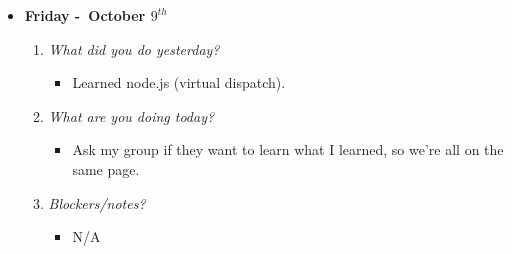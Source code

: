 \begin{itemize}
  \item[] \textbf{\large Friday -\ October \(9^{th}\)}
  \begin{enumerate}
    \item \textsl{What did you do yesterday?}
    \begin{itemize}
      \item Learned node.js (virtual dispatch).
    \end{itemize}
    \item \textsl{What are you doing today?}
    \begin{itemize}
      \item Ask my group if they want to learn what I learned, so we're all on the same page.
    \end{itemize}
    \item \textsl{Blockers/notes?}
    \begin{itemize}
      \item N/A
    \end{itemize}
  \end{enumerate}
\end{itemize}